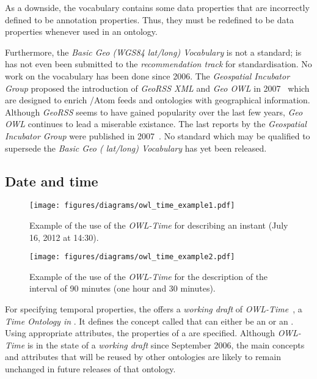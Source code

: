 As a downside, the vocabulary contains some data properties that are incorrectly defined to be annotation properties. Thus, they must be redefined to be data properties whenever used in an  ontology.

Furthermore, the \emph{Basic Geo (WGS84 lat/long) Vocabulary} is not a standard; is has not even been submitted to the \emph{ recommendation track} for standardisation. No work on the vocabulary has been done since 2006. The \emph{ Geospatial Incubator Group} proposed the introduction of \emph{GeoRSS XML} and \emph{Geo OWL} in 2007~\cite{w3c_geo_report1} which are designed to enrich /Atom feeds and  ontologies with geographical information. Although \emph{GeoRSS} seems to have gained popularity over the last few years, \emph{Geo OWL} continues to lead a miserable existance. The last reports by the \emph{ Geospatial Incubator Group} were published in 2007~\cite{w3c_geo_report1,w3c_geo_report2}. No standard which may be qualified to supersede the \emph{Basic Geo ( lat/long) Vocabulary} has yet been released.

\subsection{Date and time}
\label{subsec:date_ontologies}

\begin{figure}
\centering
\texttt{[image: figures/diagrams/owl\_time\_example1.pdf]}
\caption{Example of the use of the \emph{OWL-Time} for describing an instant (July 16, 2012 at 14:30).}
\label{fig:owl_time_example1}
\end{figure}

\begin{figure}
\centering
\texttt{[image: figures/diagrams/owl\_time\_example2.pdf]}
\caption{Example of the use of the \emph{OWL-Time} for the description of the interval of 90 minutes (one hour and 30 minutes).}
\label{fig:owl_time_example2}
\end{figure}

For specifying temporal properties, the  offers a \emph{working draft} of \emph{OWL-Time}~\cite{owl-time}, a \emph{Time Ontology in }. It defines the concept called  that can either be an  or an . Using appropriate attributes, the properties of a  are specified. Although \emph{OWL-Time} is in the state of a \emph{working draft} since September 2006, the main concepts and attributes that will be reused by other ontologies are likely to remain unchanged in future releases of that ontology.

